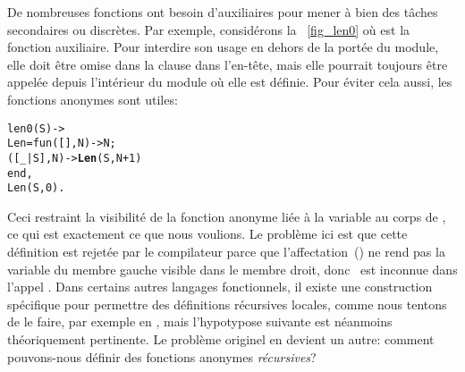 De nombreuses fonctions ont besoin d'auxiliaires pour mener à bien des
tâches secondaires ou discrètes. Par exemple, considérons la
\fig~\vref{fig_len0} où  est la fonction
auxiliaire. Pour interdire son usage en dehors de la portée du module,
elle doit être omise dans la clause  dans l'en-tête,
mais elle pourrait toujours être appelée depuis l'intérieur du module
où elle est définie. Pour éviter cela aussi, les fonctions anonymes
sont utiles:
\begin{alltt}
len0(S) -> 
  Len = fun(   [],N) -> N;
           ([\_|S],N) -> \textbf{Len}(S,N+1)\hfill% \emph{Ne compile pas}
        end,
  Len(S,0).
\end{alltt}
Ceci restraint la visibilité de la fonction anonyme liée à la variable
 au corps de , ce qui est exactement ce
que nous voulions. Le problème ici est que cette définition est
rejetée par le compilateur \Erlang parce que
l'affectation~(\erlcode{=}) ne rend pas la variable du membre gauche
visible dans le membre droit, donc ~est inconnue dans
l'appel . Dans certains autres langages
fonctionnels, il existe une construction spécifique pour permettre des
définitions récursives locales, comme nous tentons de le faire, par
exemple  en \OCaml, mais l'hypotypose suivante est
néanmoins théoriquement pertinente. Le problème originel en devient un
autre: comment pouvons-nous définir des fonctions anonymes
\emph{récursives}?

